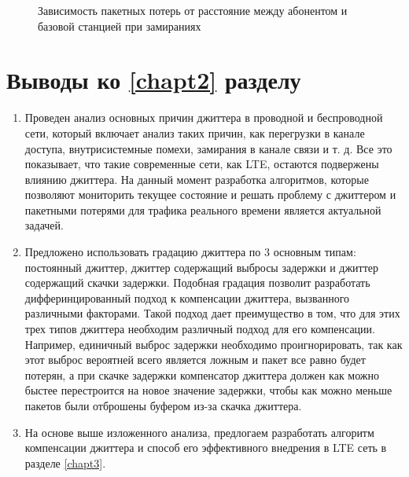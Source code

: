 \pgfplotsset{width=15cm, height=7cm, compat=1.3}
\begin{figure} [!h]
  \center
{}
\caption{Зависимость пакетных потерь от расстояние между абонентом и базовой станцией при замираниях}
  \label{img2:fad_drop}
\end{figure}




\section{Выводы ко \ref{chapt2} разделу} \label{sect:concl2}

\begin{enumerate}
\item Проведен анализ основных причин джиттера в проводной и беспроводной сети, который включает анализ таких причин, как перегрузки в канале доступа, внутрисистемные помехи, замирания в канале связи и т. д. Все это показывает, что такие современные сети, как LTE, остаются подвержены влиянию джиттера. На данный момент разработка алгоритмов, которые позволяют мониторить текущее состояние и решать проблему с джиттером и пакетными потерями для трафика реального времени является актуальной задачей.
\item Предложено использовать градацию джиттера по 3 основным типам: постоянный джиттер, джиттер содержащий выбросы задержки и джиттер содержащий скачки задержки.
Подобная градация позволит разработать дифферинцированный подход к компенсации джиттера, вызванного различными факторами. Такой подход дает преимущество в том, что для этих трех типов джиттера необходим различный подход для его компенсации. Например, единичный выброс задержки необходимо проигнорировать, так как этот выброс вероятней всего является ложным и пакет все равно будет потерян, а при скачке задержки компенсатор джиттера должен как можно быстее перестроится на новое значение задержки, чтобы как можно меньше пакетов были отброшены буфером из-за скачка джиттера.
\item На основе выше изложенного анализа, предлогаем разработать алгоритм компенсации джиттера и способ его эффективного внедрения в LTE сеть в разделе \ref{chapt3}.
\end{enumerate}

